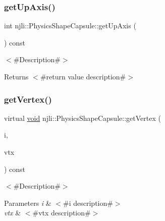 \mbox{\label{classnjli_1_1_physics_shape_capsule_a4cfa7c77b533b55bf5fc4d6bd9554afc}} 
\subsubsection{\texorpdfstring{get\+Up\+Axis()}{getUpAxis()}}
{\footnotesize\ttfamily int njli\+::\+Physics\+Shape\+Capsule\+::get\+Up\+Axis (\begin{DoxyParamCaption}{ }\end{DoxyParamCaption}) const}

$<$\#\+Description\#$>$

\begin{DoxyReturn}{Returns}
$<$\#return value description\#$>$ 
\end{DoxyReturn}
\mbox{\label{classnjli_1_1_physics_shape_capsule_afb1902c79121fd1feba6df1b8b70cbd3}} 
\subsubsection{\texorpdfstring{get\+Vertex()}{getVertex()}}
{\footnotesize\ttfamily virtual \mbox{\hyperlink{_thread_8h_af1e856da2e658414cb2456cb6f7ebc66}{void}} njli\+::\+Physics\+Shape\+Capsule\+::get\+Vertex (\begin{DoxyParamCaption}\item[{int}]{i,  }\item[{bt\+Vector3 \&}]{vtx }\end{DoxyParamCaption}) const\hspace{0.3cm}{\ttfamily [virtual]}}

$<$\#\+Description\#$>$


\begin{DoxyParams}{Parameters}
{\em i} & $<$\#i description\#$>$ \\
\hline
{\em vtx} & $<$\#vtx description\#$>$ \\
\hline
\end{DoxyParams}


